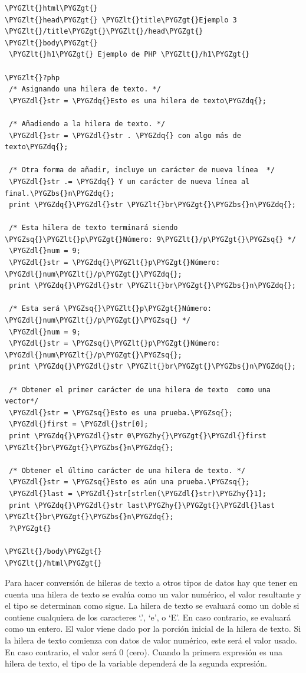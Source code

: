 \documentclass[a5paper,10pt,spanish]{sphinxmanual}
\def\PYGZbs{\char`\\}
\def\PYGZlt{\char`\<}
\def\PYGZgt{\char`\>}
\def\PYGZdl{\char`\$}
\def\PYGZhy{\char`\-}
\def\PYGZsq{\char`\'}
\def\PYGZdq{\char`\"}
\begin{document}
\begin{Verbatim}[commandchars=\\\{\}]
\PYGZlt{}html\PYGZgt{}
\PYGZlt{}head\PYGZgt{} \PYGZlt{}title\PYGZgt{}Ejemplo 3 \PYGZlt{}/title\PYGZgt{}\PYGZlt{}/head\PYGZgt{}
\PYGZlt{}body\PYGZgt{}
 \PYGZlt{}h1\PYGZgt{} Ejemplo de PHP \PYGZlt{}/h1\PYGZgt{}

\PYGZlt{}?php
 /* Asignando una hilera de texto. */
 \PYGZdl{}str = \PYGZdq{}Esto es una hilera de texto\PYGZdq{};

 /* Añadiendo a la hilera de texto. */
 \PYGZdl{}str = \PYGZdl{}str . \PYGZdq{} con algo más de texto\PYGZdq{};

 /* Otra forma de añadir, incluye un carácter de nueva línea  */
 \PYGZdl{}str .= \PYGZdq{} Y un carácter de nueva línea al final.\PYGZbs{}n\PYGZdq{};
 print \PYGZdq{}\PYGZdl{}str \PYGZlt{}br\PYGZgt{}\PYGZbs{}n\PYGZdq{};

 /* Esta hilera de texto terminará siendo \PYGZsq{}\PYGZlt{}p\PYGZgt{}Número: 9\PYGZlt{}/p\PYGZgt{}\PYGZsq{} */
 \PYGZdl{}num = 9;
 \PYGZdl{}str = \PYGZdq{}\PYGZlt{}p\PYGZgt{}Número: \PYGZdl{}num\PYGZlt{}/p\PYGZgt{}\PYGZdq{};
 print \PYGZdq{}\PYGZdl{}str \PYGZlt{}br\PYGZgt{}\PYGZbs{}n\PYGZdq{};

 /* Esta será \PYGZsq{}\PYGZlt{}p\PYGZgt{}Número: \PYGZdl{}num\PYGZlt{}/p\PYGZgt{}\PYGZsq{} */
 \PYGZdl{}num = 9;
 \PYGZdl{}str = \PYGZsq{}\PYGZlt{}p\PYGZgt{}Número: \PYGZdl{}num\PYGZlt{}/p\PYGZgt{}\PYGZsq{};
 print \PYGZdq{}\PYGZdl{}str \PYGZlt{}br\PYGZgt{}\PYGZbs{}n\PYGZdq{};

 /* Obtener el primer carácter de una hilera de texto  como una vector*/
 \PYGZdl{}str = \PYGZsq{}Esto es una prueba.\PYGZsq{};
 \PYGZdl{}first = \PYGZdl{}str[0];
 print \PYGZdq{}\PYGZdl{}str 0\PYGZhy{}\PYGZgt{}\PYGZdl{}first \PYGZlt{}br\PYGZgt{}\PYGZbs{}n\PYGZdq{};

 /* Obtener el último carácter de una hilera de texto. */
 \PYGZdl{}str = \PYGZsq{}Esto es aún una prueba.\PYGZsq{};
 \PYGZdl{}last = \PYGZdl{}str[strlen(\PYGZdl{}str)\PYGZhy{}1];
 print \PYGZdq{}\PYGZdl{}str last\PYGZhy{}\PYGZgt{}\PYGZdl{}last \PYGZlt{}br\PYGZgt{}\PYGZbs{}n\PYGZdq{};
 ?\PYGZgt{}

\PYGZlt{}/body\PYGZgt{}
\PYGZlt{}/html\PYGZgt{}
\end{Verbatim}

Para hacer conversión de hileras de texto a otros tipos de datos hay que
tener en cuenta una hilera de texto se evalúa como un valor numérico, el
valor resultante y el tipo se determinan como sigue. La hilera de texto
se evaluará como un doble si contiene cualquiera de los caracteres `.',
`e', o `E'. En caso contrario, se evaluará como un entero. El valor
viene dado por la porción inicial de la hilera de texto. Si la hilera de
texto comienza con datos de valor numérico, este será el valor usado. En
caso contrario, el valor será 0 (cero). Cuando la primera expresión es
una hilera de texto, el tipo de la variable dependerá de la segunda
expresión.
\end{document}

